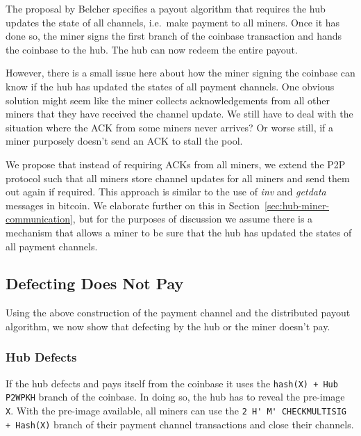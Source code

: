 \documentclass{article}
\begin{document}
The proposal by Belcher specifies a payout algorithm that requires the
hub updates the state of all channels, i.e.\ make payment to all
miners. Once it has done so, the miner signs the first branch of the
coinbase transaction and hands the coinbase to the hub. The hub can now
redeem the entire payout.

However, there is a small issue here about how the miner signing the
coinbase can know if the hub has updated the states of all payment
channels. One obvious solution might seem like the miner collects
acknowledgements from all other miners that they have received the
channel update. We still have to deal with the situation where the ACK
from some miners never arrives? Or worse still, if a miner purposely
doesn't send an ACK to stall the pool.

We propose that instead of requiring ACKs from all miners, we extend
the P2P protocol such that all miners store channel updates for all
miners and send them out again if required. This approach is similar
to the use of \emph{inv} and \emph{getdata} messages in bitcoin. We
elaborate further on this in
Section~\ref{sec:hub-miner-communication}, but for the purposes of
discussion we assume there is a mechanism that allows a miner to be
sure that the hub has updated the states of all payment channels.




\subsection{Defecting Does Not Pay}\label{ref:defecting}

Using the above construction of the payment channel and the
distributed payout algorithm, we now show that defecting by the hub or
the miner doesn't pay.

\subsubsection{Hub Defects}\label{ref:hub-defects}

If the hub defects and pays itself from the coinbase it uses the
\verb|hash(X) + Hub P2WPKH| branch of the coinbase. In doing so, the
hub has to reveal the pre-image \verb|X|. With the pre-image
available, all miners can use the
\verb|2 H' M' CHECKMULTISIG + Hash(X)| branch of their payment channel
transactions and close their channels.
\end{document}
